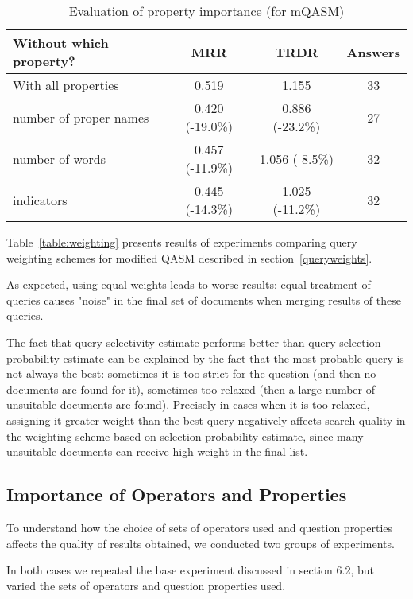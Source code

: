 \documentclass{article}
\begin{document}
\begin{table*}[tb]
\begin{center}
\begin{tabular}{|l|c|c|c|}
\hline
Without which property? & MRR & TRDR & Answers \\
\hline
\hline
With all properties & 0.519 & 1.155 & 33 \\
 number of proper names & 0.420 (-19.0\%) & 0.886 (-23.2\%) & 27 \\
 number of words & 0.457 (-11.9\%) & 1.056 (-8.5\%) & 32 \\
 indicators & 0.445 (-14.3\%) & 1.025 (-11.2\%) & 32 \\
\hline
\end{tabular}
\caption{Evaluation of property importance (for mQASM)}
\label{table:props}
\end{center}
\end{table*}

Table~\ref{table:weighting} presents results of experiments comparing
query weighting schemes for modified QASM described in section~\ref{queryweights}.

As expected, using equal weights leads to worse results:
equal treatment of queries causes "noise" in the final set of
documents when merging results of these queries.

The fact that query selectivity estimate performs better than query
selection probability estimate can be explained by the fact that the most probable query
is not always the best: sometimes it is too strict for the question
(and then no documents are found for it),
sometimes too relaxed (then a large number of unsuitable documents are found).
Precisely in cases when it is too relaxed, assigning it greater
weight than the best query negatively affects search quality
in the weighting scheme based on selection probability estimate,
since many unsuitable documents can receive high weight in the final list.

\subsection{Importance of Operators and Properties}

To understand how the choice of sets of operators used
and question properties affects the quality of results obtained, we conducted two
groups of experiments.

In both cases we repeated the base experiment
discussed in section 6.2, but
varied the sets of operators and question properties used.
\end{document}

